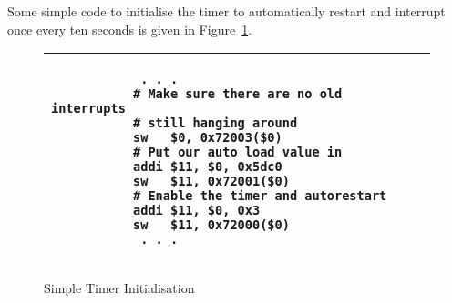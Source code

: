 Some simple code to initialise the timer to automatically restart and
interrupt once every ten seconds is given in
Figure~\ref{code:timer_init}.

\begin{figure}[h]
\begin{footnotesize}
\begin{center}
\begin{tabular}{|p{8cm}|}
\hline
\begin{verbatim}
            . . .
           # Make sure there are no old interrupts
           # still hanging around
           sw   $0, 0x72003($0)
           # Put our auto load value in
           addi $11, $0, 0x5dc0
           sw   $11, 0x72001($0)
           # Enable the timer and autorestart
           addi $11, $0, 0x3
           sw   $11, 0x72000($0)
            . . .
\end{verbatim}
\\
\hline
\end{tabular}
\end{center}
\end{footnotesize}
\caption{Simple Timer Initialisation}
\label{code:timer_init}
\end{figure}
